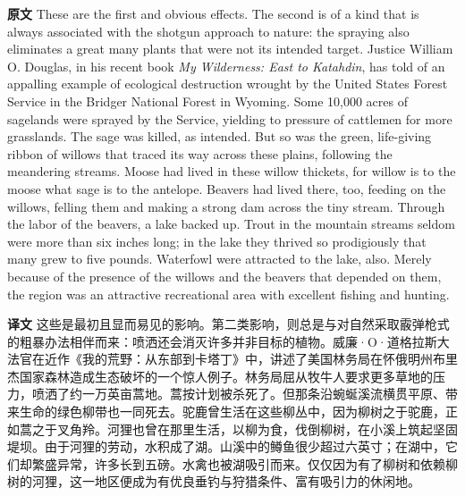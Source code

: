 \documentclass[UTF8,zihao=-4]{ctexart}
\begin{document}
\noindent\textbf{原文} These are the first and obvious effects. The second is of a kind that is always associated with the shotgun approach to nature: the spraying also eliminates a great many plants that were not its intended target. Justice William O. Douglas, in his recent book \textit{My Wilderness: East to Katahdin}, has told of an appalling example of ecological destruction wrought by the United States Forest Service in the Bridger National Forest in Wyoming. Some 10,000 acres of sagelands were sprayed by the Service, yielding to pressure of cattlemen for more grasslands. The sage was killed, as intended. But so was the green, life-giving ribbon of willows that traced its way across these plains, following the meandering streams. Moose had lived in these willow thickets, for willow is to the moose what sage is to the antelope. Beavers had lived there, too, feeding on the willows, felling them and making a strong dam across the tiny stream. Through the labor of the beavers, a lake backed up. Trout in the mountain streams seldom were more than six inches long; in the lake they thrived so prodigiously that many grew to five pounds. Waterfowl were attracted to the lake, also. Merely because of the presence of the willows and the beavers that depended on them, the region was an attractive recreational area with excellent fishing and hunting.
\par
\noindent\textbf{译文} 这些是最初且显而易见的影响。第二类影响，则总是与对自然采取霰弹枪式的粗暴办法相伴而来：喷洒还会消灭许多并非目标的植物。威廉·O·道格拉斯大法官在近作《我的荒野：从东部到卡塔丁》中，讲述了美国林务局在怀俄明州布里杰国家森林造成生态破坏的一个惊人例子。林务局屈从牧牛人要求更多草地的压力，喷洒了约一万英亩蒿地。蒿按计划被杀死了。但那条沿蜿蜒溪流横贯平原、带来生命的绿色柳带也一同死去。驼鹿曾生活在这些柳丛中，因为柳树之于驼鹿，正如蒿之于叉角羚。河狸也曾在那里生活，以柳为食，伐倒柳树，在小溪上筑起坚固堤坝。由于河狸的劳动，水积成了湖。山溪中的鳟鱼很少超过六英寸；在湖中，它们却繁盛异常，许多长到五磅。水禽也被湖吸引而来。仅仅因为有了柳树和依赖柳树的河狸，这一地区便成为有优良垂钓与狩猎条件、富有吸引力的休闲地。
\par\medskip
\end{document}
